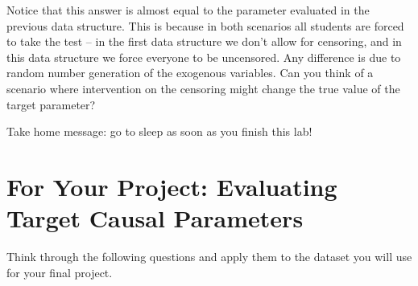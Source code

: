 \documentclass[answers]{exam}
\begin{document}
\begin{solution}
Notice that this answer is almost equal to the parameter evaluated in the previous data structure. This is because in both scenarios all students are forced to take the test -- in the first data structure we don't allow for censoring, and in this data structure we force everyone to be uncensored. Any difference is due to random number generation of the exogenous variables. Can you think of a scenario where intervention on the censoring might change the true value of the target parameter?


Take home message: go to sleep as soon as you finish this lab!

\end{solution}

\pagebreak

\section{For Your Project: Evaluating Target Causal Parameters}

Think through the following questions and apply them to the dataset you will use for your final project.
\end{document}
